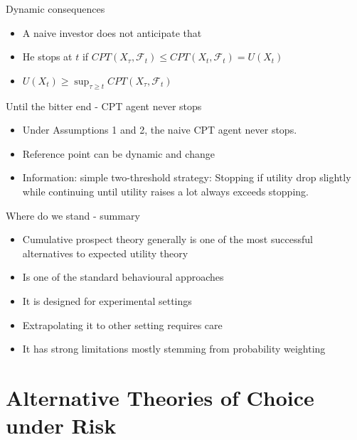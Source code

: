 \begin{frame}{Dynamic consequences}
    \begin{itemize}
        \item A naive investor does not anticipate that\medskip
        \item He stops at $t$ if $CPT(X_\tau,\mathcal{F}_t) \leq CPT(X_t,\mathcal{F}_t)=U(X_t)$\medskip
        \item $U(X_t) \geq \sup_{\tau \geq t} CPT(X_\tau,\mathcal{F}_t)$
    \end{itemize}
\end{frame}

\begin{frame}{Until the bitter end - CPT agent never stops}
    \begin{theorem}
        \begin{itemize}
        \item Under Assumptions 1 and 2, the naive CPT agent never stops.\medskip
        \item Reference point can be dynamic and change\medskip
        \item Information: simple two-threshold strategy:
        Stopping if utility drop slightly while continuing until utility raises a lot always exceeds stopping.\medskip
	\end{itemize}
\end{theorem}
\end{frame}

\begin{frame}{Where do we stand - summary}
    \begin{itemize}
        \item Cumulative prospect theory generally is one of the most successful alternatives to expected utility theory\medskip
        \item Is one of the standard behavioural approaches\medskip
        \item It is designed for experimental settings\medskip
        \item Extrapolating it to other setting requires care\medskip
        \item It has strong limitations mostly stemming from probability weighting\medskip
    \end{itemize}
\end{frame}






\section{Alternative Theories of Choice under Risk}
